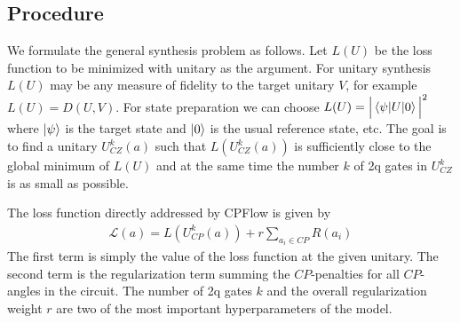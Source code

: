 \documentclass[amsfonts, amssymb, aps, nofootinbib, twocolumn]{revtex4-2}
\begin{document}
\subsection{Procedure}
We formulate the general synthesis problem as follows. Let $L(U)$ be the loss function to be minimized with unitary as the argument. For unitary synthesis $L(U)$ may be any measure of fidelity to the target unitary $V$, for example $L(U)=D(U, V)$. For state preparation we can choose $L(U) = \Big|\braket{\psi|U|0}\Big|^2$ where $\ket{\psi}$ is the target state and $\ket{0}$ is the usual reference state, etc. The goal is to find a unitary $U^k_{CZ}(a)$ such that $L(U^k_{CZ}(a))$ is sufficiently close to the global minimum of $L(U)$ and at the same time the number $k$ of 2q gates in $U^k_{CZ}$ is as small as possible. 

The loss function directly addressed by CPFlow is given by
\begin{align}
\mathcal{L}(a)=L(U^k_{CP}(a))+r\sum_{a_i\in CP} R(a_i) \label{CP loss}
\end{align}
The first term is simply the value of the loss function at the given unitary. The second term is the regularization term summing the $CP$-penalties for all $CP$-angles in the circuit. The number of 2q gates $k$ and the overall regularization weight $r$ are two of the most important hyperparameters of the model.
\end{document}
